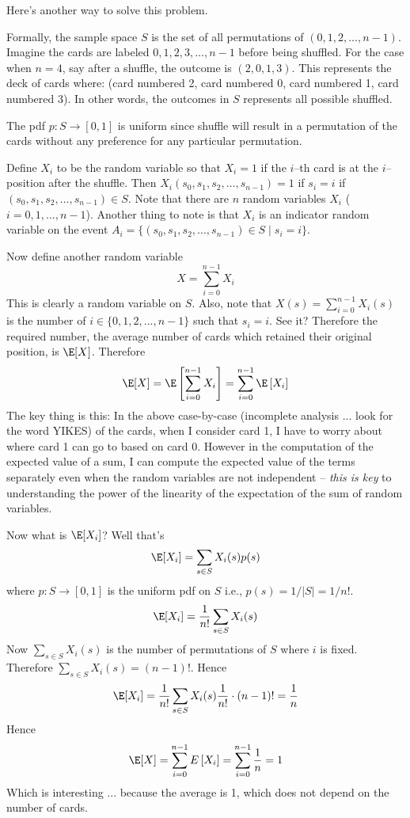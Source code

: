 Here's another way to solve this problem.

Formally, the sample space $S$ is the set of
all permutations of $(0, 1, 2, ..., n - 1)$.
Imagine the cards are labeled $0, 1, 2, 3, ..., n - 1$ before being shuffled.
For the case when $n = 4$, say after a shuffle, the outcome is $(2, 0, 1, 3)$.
This represents the deck of cards where:
(card numbered 2, card numbered 0, card numbered 1, card numbered 3).
In other words, the outcomes in $S$ represents all possible shuffled.

The pdf $p : S \rightarrow [0, 1]$ is uniform since shuffle
will result in a permutation of the cards without any preference
for any particular permutation.

Define $X_i$ to be the random variable so that $X_i = 1$
if the $i$--th card is at the $i$--position after the shuffle.
Then $X_i(s_0, s_1, s_2, \ldots, s_{n - 1}) = 1$ if $s_i = i$
if $(s_0, s_1, s_2, \ldots, s_{n - 1}) \in S$.
Note that there are $n$ random variables $X_i$ ($i = 0, 1, ..., n - 1$).
Another thing to note is that $X_i$ is an
indicator random variable on the event
$A_i = \{(s_0, s_1, s_2, ..., s_{n-1}) \in S \mid s_i = i\}$.

Now define another random variable
\[
  X = \sum_{i = 0}^{n - 1} X_i
\]
This is clearly a random variable on $S$.
Also, note that $X(s) = \sum_{i = 0}^{n - 1} X_i(s)$ is the number of $i \in \{0, 1, 2, ..., n - 1\}$
such that $s_i = i$.
See it?
Therefore the required number, the average number of
cards which retained their original position, is 
$\E[X]$.
Therefore
\[
  \E[X]
  =
  \E \left[ \sum_{i = 0} ^{n - 1}  X_i \right ]
  =
  \sum_{i = 0} ^{n - 1} \E \left[  X_i \right]
\]
The key thing is this:
In the above case-by-case (incomplete analysis ... look for the word YIKES) of the cards,
when I consider card 1, I have to worry about where card 1
can go to based on card 0.
However in the computation
of the expected value of a sum,
I can compute the expected value of the terms separately
even when the random variables are not independent -- \textit{this is key}
to understanding the power of the linearity of the expectation of the sum of
random variables.

Now what is $\E[ X_i ]$?
Well that's
\[
  \E[ X_i ] = \sum_{s \in S} X_i(s) p(s)
\]
where $p : S \rightarrow [0,1]$ is the uniform pdf on $S$ i.e., $p(s) = 1/|S| = 1/n!$.
\[
  \E[ X_i ] = \frac{1}{n!}\sum_{s \in S} X_i(s)
\]
Now $\sum_{s \in S} X_i(s)$ is the number of permutations of $S$
where $i$ is fixed.
Therefore
$\sum_{s \in S} X_i(s) = (n - 1)!$.
Hence
\[
  \E[ X_i ]
    = \frac{1}{n!}\sum_{s \in S} X_i(s) \frac{1}{n!} \cdot (n - 1)! = \frac{1}{n}
\]
Hence
\[
  \E[X] = \sum_{i = 0} ^{n - 1} E\left[  X_i \right ] = \sum_{i = 0}^{n - 1} \frac{1}{n} = 1
\]
Which is interesting ... because the average is 1, which does not depend on the
number of cards.

